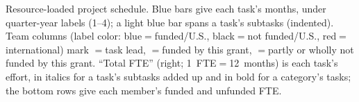 
\begin{NOTANONschedule}
\caption{Resource-loaded project schedule. Blue bars give each task's months, under quarter-year labels (1--4); a light blue bar spans a task's subtasks (indented). Team columns (label color: blue$=$funded/U.S., black$=$not funded/U.S., red$=$international) mark \TeamLeadKey$=$task lead, \TeamFundedKey$=$funded by this grant, \TeamUnfundedKey$=$partly or wholly not funded by this grant. ``Total FTE'' (right; 1~FTE$=$12~months) is each task's effort, in italics for a task's subtasks added up and in bold for a category's tasks; the bottom rows give each member's funded and unfunded FTE.}
\label{tab:NOTANONschedule}
\end{NOTANONschedule}
